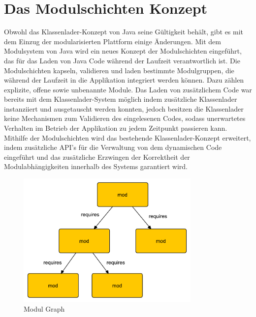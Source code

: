   \section{Das Modulschichten Konzept} \label{sec:module_layers}
     Obwohl das Klassenlader-Konzept von Java seine Gültigkeit behält, gibt es mit dem Einzug der modularisierten Plattform einige Änderungen.\newline 
     Mit dem Modulsystem von Java wird ein neues Konzept der Modulschichten eingeführt, das für das Laden von Java Code während der Laufzeit verantwortlich ist. Die Modulschichten kapseln, validieren und laden bestimmte Modulgruppen, die während der Laufzeit in die Applikation integriert werden können. Dazu zählen explizite, offene sowie unbenannte Module. \newline 
     Das Laden von zusätzlichem Code war bereits mit dem Klassenlader-System möglich indem zusätzliche Klassenlader instanziiert und ausgetauscht werden konnten, jedoch besitzen die Klassenlader keine Mechanismen zum Validieren des eingelesenen Codes, sodass unerwartetes Verhalten im Betrieb der Applikation zu jedem Zeitpunkt passieren kann. \newline
     Mithilfe der Modulschichten wird das bestehende Klassenlader-Konzept erweitert, indem zusätzliche API's für die Verwaltung von dem dynamischen Code eingeführt und das zusätzliche Erzwingen der Korrektheit der Modulabhängigkeiten innerhalb des Systems garantiert wird.\bigbreak

    \begin{figure}[h!]
      \centering
      \includegraphics[width=0.8\textwidth]{material/images/module-graph.pdf}
      \caption{Modul Graph \cite{javaMod9}}
      \label{fig:module-graph}
    \end{figure}

